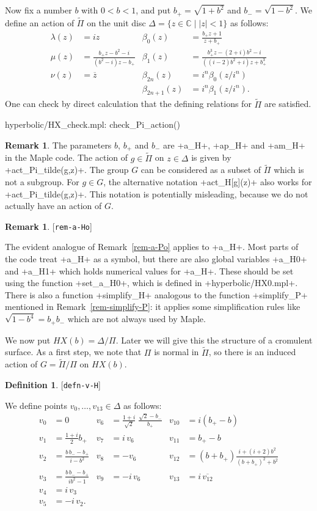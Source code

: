 \documentclass[reqno]{amsart}
\newcommand{\lbl}[1]{\label{#1}\textup{[\texttt{#1}]}\par}
\newcommand{\lbl}{\label}
\newcommand{\Dl}        {\Delta}
\newcommand{\bt}        {\beta}
\newcommand{\lm}        {\lambda}
\newcommand{\C}         {{\mathbb{C}}}
\newcommand{\ov}[1]     {\overline{#1}}
\newcommand{\st}        {\;|\;}
\newcommand{\rt}        {\sqrt{2}}
\newcommand{\tPi}	{\widetilde{\Pi}}
\renewcommand{\:}{\colon}
\theoremstyle{definition}
\newtheorem{remark}[theorem]{Remark}
\newtheorem{definition}[theorem]{Definition}
\begin{document}
Now fix a number $b$ with $0<b<1$, and put $b_+=\sqrt{1+b^2}$ and
$b_-=\sqrt{1-b^2}$.  We define an action of $\tPi$ on the
unit disc $\Dl=\{z\in\C\st |z|<1\}$ as follows:
\begin{align*}
 \lm(z) &= iz &
 \bt_0(z) &= \frac{b_+z+1}{z+b_+} \\
 \mu(z) &= \frac{b_+z-b^2-i}{(b^2-i)z-b_+} &
 \bt_1(z) &= \frac{b_+^3z-(2+i)b^2-i}{((i-2)b^2+i)z+b_+^3} \\
 \nu(z) &= \ov{z} &
 \bt_{2n}(z) &= i^n\bt_0(z/i^n) \\
 &&
 \bt_{2n+1}(z) &= i^n\bt_1(z/i^n).
\end{align*}
One can check by direct calculation that the defining relations for
$\tPi$ are satisfied.
\begin{checks}
 hyperbolic/HX_check.mpl: check_Pi_action()
\end{checks}
\begin{remark}
 The parameters $b$, $b_+$ and $b_-$ are \mcode+a_H+, \mcode+ap_H+ and
 \mcode+am_H+ in the Maple code.  The action of $g\in\tPi$ on $z\in\Dl$
 is given by \mcode+act_Pi_tilde(g,z)+.  The group $G$ can be
 considered as a subset of $\tPi$ which is not a subgroup.  For
 $g\in G$, the alternative notation \mcode+act_H[g](z)+ also works for
 \mcode+act_Pi_tilde(g,z)+.  This notation is potentially misleading,
 because we do not actually have an action of $G$.
\end{remark}
\begin{remark}\lbl{rem-a-Ho}
 The evident analogue of Remark~\ref{rem-a-Po} applies to \mcode+a_H+.
 Most parts of the code treat \mcode+a_H+ as a symbol, but there are
 also global variables \mcode+a_H0+ and \mcode+a_H1+ which holds
 numerical values for \mcode+a_H+.  These should be set using the
 function \mcode+set_a_H0+, which is defined in
 \fname+hyperbolic/HX0.mpl+.  There is also a function
 \mcode+simplify_H+ analogous to the function \mcode+simplify_P+
 mentioned in Remark~\ref{rem-simplify-P}: it applies some
 simplification rules like $\sqrt{1-b^4}=b_+b_-$ which are not always
 used by Maple.
\end{remark}

We now put $HX(b)=\Dl/\Pi$.  Later we will give this the structure of a
cromulent surface.  As a first step, we note that $\Pi$ is normal in
$\tPi$, so there is an induced action of $G=\tPi/\Pi$ on $HX(b)$.

\begin{definition}\lbl{defn-v-H}
 We define points $v_0,\dotsc,v_{13}\in \Dl$ as follows:
 \begin{align*}
  v_0 &= 0 &
   v_6 &= \frac{1+i}{\rt}\;\frac{\rt-b_-}{b_+} &
    v_{10} &= i(b_+-b) \\
  v_1 &= \frac{1+i}{2}b_+ &
   v_7 &= i \, v_6 &
    v_{11} &= b_+-b \\
  v_2 &= \frac{b\,b_--b_+}{i-b^2} &
   v_8 &= -v_6 &
    v_{12} &= (b+b_+)\frac{i+(i+2)b^2}{(b+b_+)^2+b^2} \\
  v_3 &= \frac{b\,b_--b_+}{ib^2-1} &
   v_9 &= -i\, v_6 &
    v_{13} &= i\,\ov{v_{12}} \\
  v_4 &= i \, v_3 \\
  v_5 &= -i \, v_2.
 \end{align*}
\end{definition}
\end{document}
